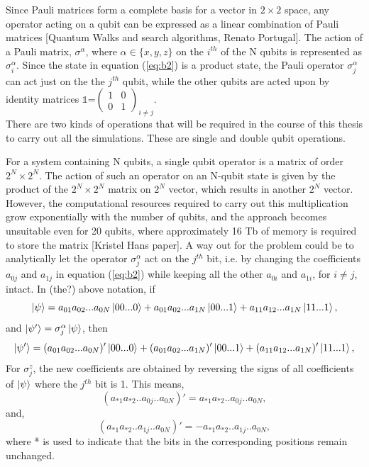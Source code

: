 \documentclass[12]{article}
\begin{document}
Since Pauli matrices form a complete basis for a vector in $2 \times 2$ space, any operator acting on a qubit can be expressed as a linear combination of Pauli matrices [Quantum Walks and search algorithms, Renato Portugal]. The action of a Pauli matrix, $\sigma^\alpha$, where $\alpha \in \{x,y,z\}$ on the $i^{th}$ of the N qubits is represented as $\sigma_i^\alpha$. Since the state in equation (\ref{eq:b2}) is a product state, the Pauli operator $\sigma_j^\alpha$ can act just on the the $j^{th}$ qubit, while the other qubits are acted upon by identity matrices $\mathbb{1}$=$\begin{pmatrix}
1&0\\
0&1
\end{pmatrix}_{i \neq j}
$.\\

There are two kinds of operations that will be required in the course of this thesis to carry out all the simulations. These are single and double qubit operations. 


For a system containing N qubits, a single qubit operator is a matrix of order $2^N \times 2^N$. The action of such an operator on an N-qubit state is given by the product of the $2^N \times 2^N$ matrix on $2^N$ vector, which results in another  $2^N$ vector. However, the computational resources required to carry out this multiplication grow exponentially with the number of qubits, and the approach becomes unsuitable even for 20 qubits, where approximately 16 Tb of memory is required to store the matrix [Kristel Hans paper]. A way out for the problem could be to analytically let the operator $\sigma_j^\alpha$ act on the $j^{th}$ bit, i.e. by changing the coefficients $a_{0j}$ and $a_{1j}$ in equation (\ref{eq:b2}) while keeping all the other $a_{0i}$ and $a_{1i}$, for $i \neq j$, intact. In (the?) above notation, if
\begin{equation}
\ket{\psi}= a_{01}a_{02}...a_{0N}\ket{00...0}+a_{01}a_{02}...a_{1N}\ket{00...1}+a_{11}a_{12}...a_{1N}\ket{11...1},
\end{equation}
and $\ket{\psi'}=\sigma_j^\alpha \ket{\psi}$, then
\begin{equation}
\ket{\psi'}= (a_{01}a_{02}...a_{0N})'\ket{00...0}+(a_{01}a_{02}...a_{1N})'\ket{00...1}+(a_{11}a_{12}...a_{1N})'\ket{11...1},
\end{equation}
For $\sigma_j^z$, the new coefficients are obtained by reversing the signs of all coefficients of $\ket{\psi}$ where the $j^{th}$ bit is 1. This means, 
\begin{equation}
(a_{*1}a_{*2}..a_{0j}..a_{0N})'=a_{*1}a_{*2}..a_{0j}..a_{0N},
\end{equation}
and,
\begin{equation}
(a_{*1}a_{*2}..a_{1j}..a_{0N})'=-a_{*1}a_{*2}..a_{1j}..a_{0N},
\end{equation}
where * is used to indicate that the bits in the corresponding positions remain unchanged.
\end{document}
